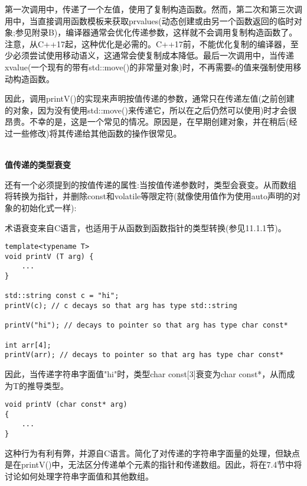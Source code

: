 第一次调用中，传递了一个左值，使用了复制构造函数。然而，第二次和第三次调用中，当直接调用函数模板来获取prvalues(动态创建或由另一个函数返回的临时对象;参见附录B)，编译器通常会优化传递参数，这样就不会调用复制构造函数了。注意，从C++17起，这种优化是必需的。C++17前，不能优化复制的编译器，至少必须尝试使用移动语义，这通常会使复制成本降低。最后一次调用中，当传递xvalue(一个现有的带有std::move()的非常量对象)时，不再需要s的值来强制使用移动构造函数。

因此，调用printV()的实现来声明按值传递的参数，通常只在传递左值(之前创建的对象，因为没有使用std::move()来传递它，所以在之后仍然可以使用)时才会很昂贵。不幸的是，这是一个常见的情况。原因是，在早期创建对象，并在稍后(经过一些修改)将其传递给其他函数的操作很常见。

\hspace*{\fill} \\ %
\noindent
\textbf{值传递的类型衰变}

还有一个必须提到的按值传递的属性:当按值传递参数时，类型会衰变。从而数组将转换为指针，并删除const和volatile等限定符(就像使用值作为使用auto声明的对象的初始化式一样):

\begin{tcolorbox}[colback=webgreen!5!white,colframe=webgreen!75!black]
\hspace*{0.75cm}术语衰变来自C语言，也适用于从函数到函数指针的类型转换(参见11.1.1节)。
\end{tcolorbox}

\begin{lstlisting}[style=styleCXX]
template<typename T>
void printV (T arg) {
	...
}

std::string const c = "hi";
printV(c); // c decays so that arg has type std::string

printV("hi"); // decays to pointer so that arg has type char const*

int arr[4];
printV(arr); // decays to pointer so that arg has type char const*
\end{lstlisting}

因此，当传递字符串字面值"hi"时，类型char const[3]衰变为char const*，从而成为T的推导类型。

\begin{lstlisting}[style=styleCXX]
void printV (char const* arg)
{
	...
}
\end{lstlisting}

这种行为有利有弊，并源自C语言。简化了对传递的字符串字面量的处理，但缺点是在printV()中，无法区分传递单个元素的指针和传递数组。因此，将在7.4节中将讨论如何处理字符串字面值和其他数组。





